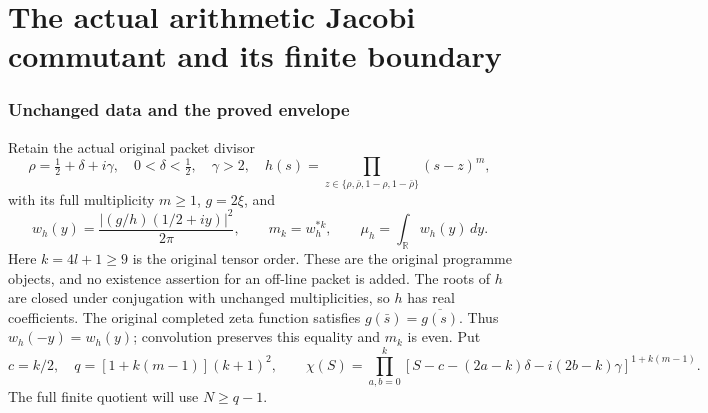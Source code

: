 \endgroup

\clearpage\begingroup
\part*{The actual arithmetic Jacobi commutant and its finite boundary}
\newtheorem{ljacobitheorem}{Theorem}
\newtheorem{ljacobiproposition}[ljacobitheorem]{Proposition}
\newcommand{\ljacobiR}{\mathbb R}
\newcommand{\ljacobiC}{\mathbb C}
\newcommand{\ljacobiN}{\mathbb N}
\newcommand{\ljacobiJ}{\mathcal J}
\newcommand{\ljacobiCC}{\mathcal C}
\newcommand{\ljacobiDom}{\operatorname{Dom}}



\section{Unchanged data and the proved envelope}

Retain the actual original packet divisor
\[
 \rho=\tfrac12+\delta+i\gamma,\quad 0<\delta<\tfrac12,\quad\gamma>2,
 \quad h(s)=\prod_{z\in\{\rho,\bar\rho,1-\rho,1-\bar\rho\}}(s-z)^m,
\]
with its full multiplicity $m\geq1$, $g=2\xi$, and
\[
 w_h(y)=\frac{|(g/h)(1/2+iy)|^2}{2\pi},\qquad
 m_k=w_h^{*k},\qquad \mu_h=\int_\ljacobiR w_h(y)\,dy.
\]
Here $k=4l+1\geq9$ is the original tensor order. These are the
original programme objects, and no existence assertion for an
off-line packet is added. The roots of $h$ are closed under conjugation
with unchanged multiplicities, so $h$ has real coefficients. The
original completed zeta function satisfies
$g(\bar s)=\overline{g(s)}$. Thus $w_h(-y)=w_h(y)$; convolution
preserves this equality and $m_k$ is even. Put
\[
 c=k/2,\quad q=[1+k(m-1)](k+1)^2,\qquad
 \chi(S)=\prod_{a,b=0}^k
 [S-c-(2a-k)\delta-i(2b-k)\gamma]^{1+k(m-1)}.
\]
The full finite quotient will use $N\geq q-1$.

